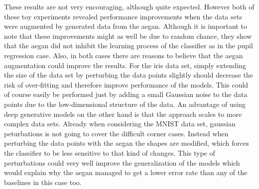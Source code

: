 These results are not very encouraging, although quite expected. However both of these toy experiments revealed performance improvements when the data sets were augmented by generated data from the \acrshort{aegan}. Although it is important to note that these improvements might as well be due to random chance, they show that the \acrshort{aegan} did not inhibit the learning process of the classifier as in the pupil regression case. Also, in both cases there are reasons to believe that the \acrshort{aegan} augmentation could improve the results. For the iris data set, simply extending the size of the data set by perturbing the data points slightly should decrease the risk of over-fitting and therefore improve performance of the models. This could of course easily be performed just by adding a small Gaussian noise to the data points due to the low-dimensional structure of the data. An advantage of using deep generative models on the other hand is that the approach scales to more complex data sets. Already when considering the MNIST data set, gaussian peturbations is not going to cover the difficult corner cases. Instead when perturbing the data points with the \acrshort{aegan} the shapes are modified, which forces the classifier to be less sensitive to that kind of changes. This type of perturbations could very well improve the generalization of the models which would explain why the \acrshort{aegan} managed to get a lower error rate than any of the baselines in this case too.



